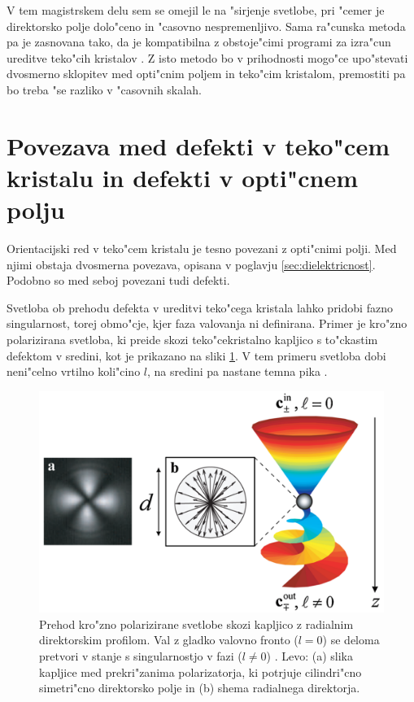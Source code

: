 \documentclass[12pt,twoside,openright,final]{report}
\begin{document}
V tem magistrskem delu sem se omejil le na "sirjenje svetlobe, pri "cemer je direktorsko polje dolo"ceno in "casovno nespremenljivo. 
Sama ra"cunska metoda pa je zasnovana tako, da je kompatibilna z obstoje"cimi programi za izra"cun ureditve teko"cih kristalov \cite{ravnik-zumer-ldg}. 
Z isto metodo bo v prihodnosti mogo"ce upo"stevati dvosmerno sklopitev med opti"cnim poljem in teko"cim kristalom, premostiti pa bo treba "se razliko v "casovnih skalah. 

\section{Povezava med defekti v teko"cem kristalu in defekti v opti"cnem polju}
Orientacijski red v teko"cem kristalu je tesno povezani z opti"cnimi polji. 
Med njimi obstaja dvosmerna povezava, opisana v poglavju \ref{sec:dielektricnost}. 
Podobno so med seboj povezani tudi defekti. 

Svetloba ob prehodu defekta v ureditvi teko"cega kristala lahko pridobi fazno singularnost, torej obmo"cje, kjer faza valovanja ni definirana. 
Primer je kro"zno polarizirana svetloba, ki preide skozi teko"cekristalno kapljico s to"ckastim defektom v sredini, kot je prikazano na sliki \ref{fig:defekt-kapljica}. 
V tem primeru svetloba dobi neni"celno vrtilno koli"cino $l$, na sredini pa nastane temna pika \cite{brasselet-droplet}. 

\begin{figure}[!htbp]
 \centering
 \includegraphics[width=.8\textwidth]{defekt-kapljica}
 \caption{Prehod kro"zno polarizirane svetlobe skozi kapljico z radialnim direktorskim profilom. Val z gladko valovno fronto ($l=0$) se deloma pretvori v stanje s singularnostjo v fazi ($l\neq 0$) \cite{brasselet-droplet}. Levo: (a) slika kapljice med prekri"zanima polarizatorja, ki potrjuje cilindri"cno simetri"cno direktorsko polje in (b) shema radialnega direktorja. }
 \label{fig:defekt-kapljica}
\end{figure}
\end{document}
